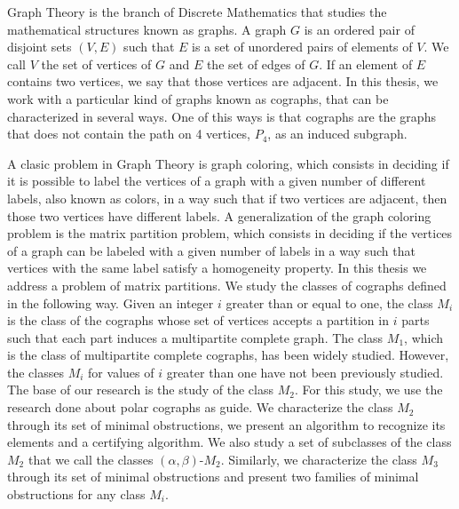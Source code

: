 Graph Theory is the branch of Discrete Mathematics that studies the mathematical structures known as graphs. A graph $G$ is an ordered pair of disjoint sets $(V,E)$ such that $E$ is a set of unordered pairs of elements of $V$. We call $V$ the set of vertices of $G$ and $E$ the set of edges of $G$. If an element of $E$ contains two vertices, we say that those vertices are adjacent. In this thesis, we work with a particular kind of graphs known as cographs, that can be characterized in several ways. One of this ways is that cographs are the graphs that does not contain the path on 4 vertices, $P_4$, as an induced subgraph.

A clasic problem in Graph Theory is graph coloring, which consists in deciding if it is possible to label the vertices of a graph with a given number of different labels, also known as colors, in a way such that if two vertices are adjacent, then those two vertices have different labels. A generalization of the graph coloring problem is the matrix partition problem, which consists in deciding if the vertices of a graph can be labeled with a given number of labels in a way such that vertices with the same label satisfy a homogeneity property. In this thesis we address a problem of matrix partitions. We study the classes of cographs defined in the following way. Given an integer $i$ greater than or equal to one, the class $M_i$ is the class of the cographs whose set of vertices accepts a partition in $i$ parts such that each part induces a multipartite complete graph. The class $M_1$, which is the class of multipartite complete cographs, has been widely studied. However, the classes $M_i$ for values of $i$ greater than one have not been previously studied. The base of our research is the study of the class $M_2$. For this study, we use the research done about polar cographs as guide. We characterize the class $M_2$ through its set of minimal obstructions, we present an algorithm to recognize its elements and a certifying algorithm. We also study a set of subclasses of the class $M_2$ that we call the classes $(\alpha,\beta)$-$M_2$. Similarly, we characterize the class $M_3$ through its set of minimal obstructions and present two families of minimal obstructions for any class $M_i$.
